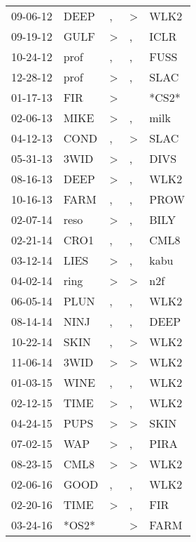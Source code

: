 \begin{supertabular}{lllll}
 09-06-12 &   DEEP &             , &  \textgreater &   WLK2 \\
 09-19-12 &   GULF &  \textgreater &             , &   ICLR \\
 10-24-12 &   prof &             , &             , &   FUSS \\
 12-28-12 &   prof &  \textgreater &             , &   SLAC \\
 01-17-13 &    FIR &  \textgreater &               &  *CS2* \\
 02-06-13 &   MIKE &  \textgreater &             , &   milk \\
 04-12-13 &   COND &             , &  \textgreater &   SLAC \\
 05-31-13 &   3WID &  \textgreater &             , &   DIVS \\
 08-16-13 &   DEEP &  \textgreater &             , &   WLK2 \\
 10-16-13 &   FARM &             , &             , &   PROW \\
 02-07-14 &   reso &  \textgreater &             , &   BILY \\
 02-21-14 &   CRO1 &             , &             , &   CML8 \\
 03-12-14 &   LIES &  \textgreater &             , &   kabu \\
 04-02-14 &   ring &  \textgreater &  \textgreater &    n2f \\
 06-05-14 &   PLUN &             , &             , &   WLK2 \\
 08-14-14 &   NINJ &             , &             , &   DEEP \\
 10-22-14 &   SKIN &             , &  \textgreater &   WLK2 \\
 11-06-14 &   3WID &  \textgreater &  \textgreater &   WLK2 \\
 01-03-15 &   WINE &             , &             , &   WLK2 \\
 02-12-15 &   TIME &  \textgreater &             , &   WLK2 \\
 04-24-15 &   PUPS &  \textgreater &  \textgreater &   SKIN \\
 07-02-15 &    WAP &  \textgreater &             , &   PIRA \\
 08-23-15 &   CML8 &  \textgreater &  \textgreater &   WLK2 \\
 02-06-16 &   GOOD &             , &             , &   WLK2 \\
 02-20-16 &   TIME &  \textgreater &             , &    FIR \\
 03-24-16 &  *OS2* &               &  \textgreater &   FARM \\

\end{supertabular}
